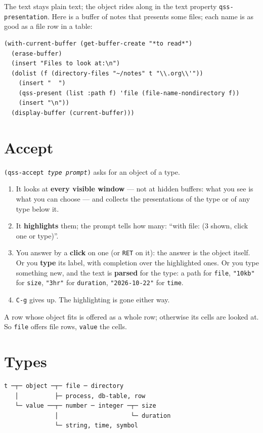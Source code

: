 \documentclass[
  paper=a4, fontsize=11pt, parskip=half, headings=small,
  toc=bibliography, numbers=noenddot, DIV=12
]{scrreprt}
\newcommand{\code}[1]{\texttt{#1}}
\newcommand{\kbd}[1]{\texttt{#1}}
\begin{document}
The text stays plain text; the object rides along in the text property
\code{qss-presentation}. Here is a buffer of notes that presents some files; each
name is as good as a file row in a table:

\begin{lstlisting}
(with-current-buffer (get-buffer-create "*to read*")
  (erase-buffer)
  (insert "Files to look at:\n")
  (dolist (f (directory-files "~/notes" t "\\.org\\'"))
    (insert "  ")
    (qss-present (list :path f) 'file (file-name-nondirectory f))
    (insert "\n"))
  (display-buffer (current-buffer)))
\end{lstlisting}

\section{Accept}

\code{(qss-accept \emph{type} \emph{prompt})} asks for an object of a type.

\begin{enumerate}
\item It looks at \textbf{every visible window} --- not at hidden buffers: what
  you see is what you can choose --- and collects the presentations of the type
  or of any type below it.
\item It \textbf{highlights} them; the prompt tells how many: \enquote{with
  file: (3 shown, click one or type)}.
\item You answer by a \textbf{click} on one (or \kbd{RET} on it): the answer is
  the object itself. Or you \textbf{type} its label, with completion over the
  highlighted ones. Or you type something new, and the text is \textbf{parsed}
  for the type: a path for \code{file}, \code{"10kb"} for \code{size},
  \code{"3hr"} for \code{duration}, \code{"2026-10-22"} for \code{time}.
\item \kbd{C-g} gives up. The highlighting is gone either way.
\end{enumerate}

A row whose object fits is offered as a whole row; otherwise its cells are
looked at. So \code{file} offers file rows, \code{value} the cells.

\section{Types}

\begin{Verbatim}
t ─┬─ object ─┬─ file ─ directory
   │          ├─ process, db-table, row
   └─ value ──┬─ number ─ integer ─┬─ size
              │                    └─ duration
              └─ string, time, symbol
\end{Verbatim}
\end{document}
